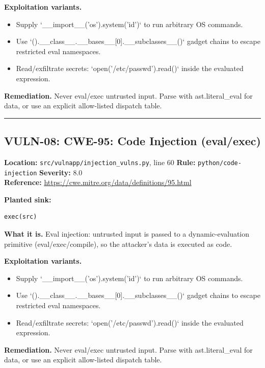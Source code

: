 \documentclass[11pt,a4paper]{article}
\begin{document}
\noindent\textbf{Exploitation variants.}
\begin{itemize}[leftmargin=1.4em,itemsep=1pt,topsep=2pt]
\item Supply `\_\_import\_\_('os').system('id')` to run arbitrary OS commands.
\item Use `().\_\_class\_\_.\_\_bases\_\_[0].\_\_subclasses\_\_()` gadget chains to escape restricted eval namespaces.
\item Read/exfiltrate secrets: `open('/etc/passwd').read()` inside the evaluated expression.
\end{itemize}
\noindent\textbf{Remediation.} Never eval/exec untrusted input. Parse with ast.literal\_eval for data, or use an explicit allow-listed dispatch table.

\vspace{4pt}\hrule\vspace{6pt}
\subsection{VULN-08: CWE-95: Code Injection (eval/exec)}
\noindent\textbf{Location:} \texttt{src/vulnapp/injection\_vulns.py}, line 60 \quad \textbf{Rule:} \texttt{python/code-injection} \quad \textbf{Severity:} 8.0
\\ \textbf{Reference:} \url{https://cwe.mitre.org/data/definitions/95.html}

\noindent\textbf{Planted sink:}
\begin{lstlisting}
exec(src)
\end{lstlisting}
\noindent\textbf{What it is.} Eval injection: untrusted input is passed to a dynamic-evaluation primitive (eval/exec/compile), so the attacker's data is executed as code.

\noindent\textbf{Exploitation variants.}
\begin{itemize}[leftmargin=1.4em,itemsep=1pt,topsep=2pt]
\item Supply `\_\_import\_\_('os').system('id')` to run arbitrary OS commands.
\item Use `().\_\_class\_\_.\_\_bases\_\_[0].\_\_subclasses\_\_()` gadget chains to escape restricted eval namespaces.
\item Read/exfiltrate secrets: `open('/etc/passwd').read()` inside the evaluated expression.
\end{itemize}
\noindent\textbf{Remediation.} Never eval/exec untrusted input. Parse with ast.literal\_eval for data, or use an explicit allow-listed dispatch table.
\end{document}

